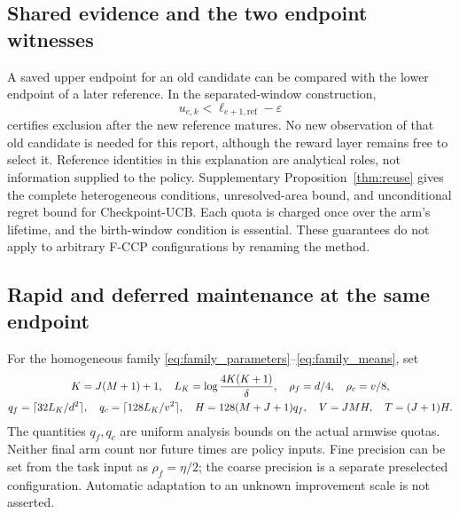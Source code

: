 \documentclass[11pt]{article}
\theoremstyle{remark}
\begin{document}
\subsection{Shared evidence and the two endpoint witnesses}

A saved upper endpoint for an old candidate can be compared with the lower
endpoint of a later reference. In the separated-window construction,
\[
 u_{e,k}<\ell_{e+1,\mathrm{ref}}-\varepsilon
\]
certifies exclusion after the new reference matures. No new observation
of that old candidate is needed for this report, although the reward
layer remains free to select it. Reference identities in this explanation
are analytical roles, not information supplied to the policy.
Supplementary Proposition~\ref{thm:reuse} gives the complete heterogeneous
conditions, unresolved-area bound, and unconditional regret bound for
Checkpoint-UCB. Each quota is charged once over the arm's lifetime, and
the birth-window condition is essential. These guarantees do not apply
to arbitrary F-CCP configurations by renaming the method.

\subsection{Rapid and deferred maintenance at the same endpoint}

For the homogeneous family
\eqref{eq:family_parameters}--\eqref{eq:family_means}, set
\begin{gather}
 K=J(M+1)+1,\quad L_K=\log\frac{4K(K+1)}\delta,\quad
 \rho_f=d/4,\quad\rho_c=v/8,\notag\\
 q_f=\lceil32L_K/d^2\rceil,\quad q_c=\lceil128L_K/v^2\rceil,\quad
 H=128(M+J+1)q_f,\quad V=JMH,\quad T=(J+1)H.
 \label{eq:chosen_horizon}
\end{gather}
The quantities $q_f,q_c$ are uniform analysis bounds on the actual armwise
quotas. Neither final arm count nor future times are policy inputs. Fine
precision can be set from the task input as $\rho_f=\eta/2$; the coarse
precision is a separate preselected configuration. Automatic adaptation to
an unknown improvement scale is not asserted.
\end{document}

